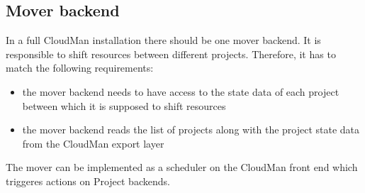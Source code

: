 \subsection{Mover backend}
In a full CloudMan installation there should be one mover backend. It is responsible to shift resources between different projects. Therefore, it has to match the following requirements:

\begin{itemize}
 \item the mover backend needs to have access to the state data of each project between which it is supposed to shift resources
 \item the mover backend reads the list of projects along with the project state data from the CloudMan export layer
\end{itemize}
The mover can be implemented as a scheduler on the CloudMan front end which triggeres actions on Project backends. 




 

